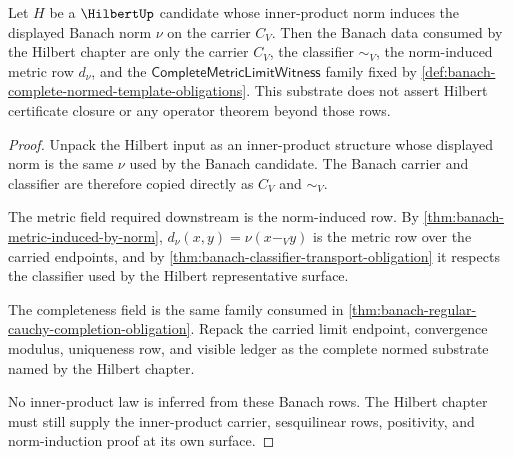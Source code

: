 \begin{theorem}
\label{thm:banach-hilbert-downstream-substrate}
Let $H$ be a $\HilbertUp$ candidate whose inner-product norm induces the
displayed Banach norm $\nu$ on the carrier $C_V$. Then the Banach data
consumed by the Hilbert chapter are only the carrier $C_V$, the classifier
$\sim_V$, the norm-induced metric row $d_\nu$, and the
$\mathsf{CompleteMetricLimitWitness}$ family fixed by
\autoref{def:banach-complete-normed-template-obligations}. This substrate does
not assert Hilbert certificate closure or any operator theorem beyond those
rows.
\end{theorem}
\begin{proof}
Unpack the Hilbert input as an inner-product structure whose displayed norm
is the same $\nu$ used by the Banach candidate. The Banach carrier and
classifier are therefore copied directly as $C_V$ and $\sim_V$.

The metric field required downstream is the norm-induced row. By
\autoref{thm:banach-metric-induced-by-norm}, $d_\nu(x,y)=\nu(x-_V y)$ is the
metric row over the carried endpoints, and by
\autoref{thm:banach-classifier-transport-obligation} it respects the
classifier used by the Hilbert representative surface.

The completeness field is the same family consumed in
\autoref{thm:banach-regular-cauchy-completion-obligation}. Repack the carried
limit endpoint, convergence modulus, uniqueness row, and visible ledger as
the complete normed substrate named by the Hilbert chapter.

No inner-product law is inferred from these Banach rows. The Hilbert chapter
must still supply the inner-product carrier, sesquilinear rows, positivity,
and norm-induction proof at its own surface.
\end{proof}

